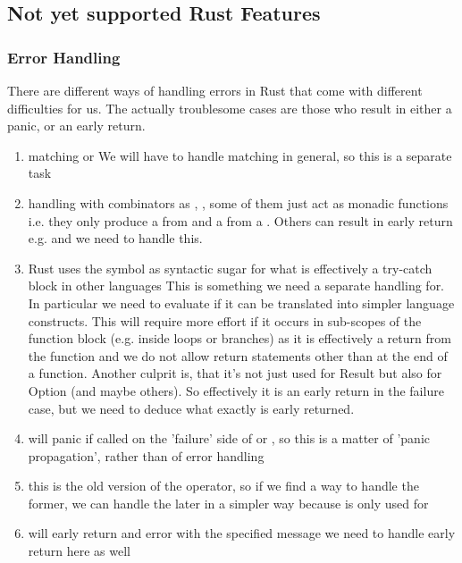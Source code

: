 

\subsection{Not yet supported Rust Features}
\subsubsection{Error Handling} 
There are different ways of handling errors in Rust that come with different difficulties for us. The actually troublesome cases are those who result in either a panic, or an early return. 
    \begin{enumerate}
        \item matching  or  \means We will have to handle matching in general, so this is a separate task
        \item handling with combinators as ,  ,  \means some of them just act as monadic functions i.e. they only produce a  from  and a  from a . Others can result in early return e.g.  and we need to handle this.
        \item Rust uses the  symbol as syntactic sugar for what is effectively a try-catch block in other languages \means This is something we need a separate handling for. In particular we need to evaluate if it can be translated into simpler language constructs. This will require more effort if it occurs in sub-scopes of the function block (e.g. inside loops or branches) as it is effectively a return from the function and we do not allow return statements other than at the end of a function. Another culprit is, that it's not just used for Result but also for Option (and maybe others). So effectively it is an early return in the failure case, but we need to deduce what exactly is early returned. 
        \item {} \means will panic if called on the 'failure' side of  or , so this is a matter of 'panic propagation', rather than of error handling
        \item {} \means this is the old version of the  operator, so if we find a way to handle the former, we can handle the later in a simpler way because  is only used for 
        \item {} will early return and error with the specified message \means we need to handle early return here as well
    \end{enumerate}
    
